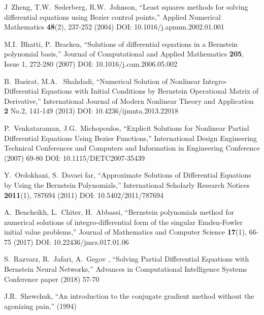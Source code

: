 \documentclass[12pt]{article}
\begin{document}
\begin{thebibliography}{0}
	J~Zheng, T.W.~Sederberg, R.W.~Johnson,
	``Least squares methods for solving differential equations using Bezier control points,''
	Applied Numerical Mathematics \textbf{48}(2), 237-252 (2004)
	DOI: 10.1016/j.apnum.2002.01.001

	M.I.~Bhatti, P.~Bracken,
	``Solutions of differential equations in a Bernstein polynomial basis,''
	Journal of Computational and Applied Mathematics  \textbf{205}, Issue 1, 272-280 (2007)
	DOI: 10.1016/j.cam.2006.05.002

	B.~Basirat, M.A.~ Shahdadi,
	``Numerical Solution of Nonlinear Integro-Differential Equations with Initial Conditions by Bernstein Operational Matrix of Derivative,''
	International Journal of Modern Nonlinear Theory and Application \textbf{2} No.2, 141-149 (2013)
	DOI: 10.4236/ijmnta.2013.22018

	P.~Venkataraman, J.G.~Michopoulos,
	``Explicit Solutions for Nonlinear Partial Differential Equations Using Bezier Functions,''
	International Design Engineering Technical Conferences and Computers and Information in Engineering Conference (2007) 69-80
	DOI: 10.1115/DETC2007-35439

	Y.~Ordokhani, S.~Davaei far,
	``Approximate Solutions of Differential Equations by Using the Bernstein Polynomials,''
	International Scholarly Research Notices \textbf{2011}(1), 787694 (2011)
	DOI: 10.5402/2011/787694

	A.~Bencheikh, L.~Chiter, H.~Abbassi,
	``Bernstein polynomials method for numerical solutions of  integro-differential form of the singular Emden-Fowler initial value problems,''
	Journal of Mathematics and Computer Science \textbf{17}(1), 66-75 (2017)
	DOI: 10.22436/jmcs.017.01.06	
	
	S.~Razvarz, R.~Jafari, A.~Gegov ,
	``Solving Partial Differential Equations with Bernstein Neural Networks,''
	Advances in Computational Intelligence Systems Conference paper (2018) 57-70

	J.R.~Shewchuk, 
	``An introduction to the conjugate gradient method without the agonizing pain,''
	(1994)

\end{thebibliography}
\end{document}
